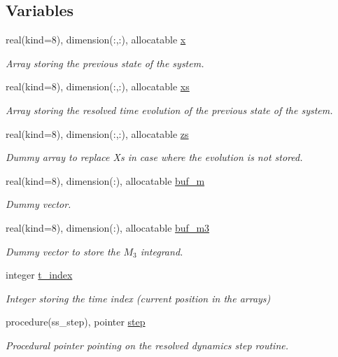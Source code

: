 \subsection*{Variables}
\begin{DoxyCompactItemize}
\item 
real(kind=8), dimension(\+:,\+:), allocatable \hyperlink{namespacememory_aa7e328e0fcaf0f4fdf9dc450ccfdfd5b}{x}
\begin{DoxyCompactList}\small\item\em Array storing the previous state of the system. \end{DoxyCompactList}\item 
real(kind=8), dimension(\+:,\+:), allocatable \hyperlink{namespacememory_ab57f9b5df41de423255f146f2cf3220a}{xs}
\begin{DoxyCompactList}\small\item\em Array storing the resolved time evolution of the previous state of the system. \end{DoxyCompactList}\item 
real(kind=8), dimension(\+:,\+:), allocatable \hyperlink{namespacememory_a7ea83fadf351bfaa6c8ec2540cb80a87}{zs}
\begin{DoxyCompactList}\small\item\em Dummy array to replace Xs in case where the evolution is not stored. \end{DoxyCompactList}\item 
real(kind=8), dimension(\+:), allocatable \hyperlink{namespacememory_a533d8a2daef9b9feb5ee1cad8b2ae0c7}{buf\+\_\+m}
\begin{DoxyCompactList}\small\item\em Dummy vector. \end{DoxyCompactList}\item 
real(kind=8), dimension(\+:), allocatable \hyperlink{namespacememory_a69ca63c73a29fb91cce2a4c640c94403}{buf\+\_\+m3}
\begin{DoxyCompactList}\small\item\em Dummy vector to store the $M_3$ integrand. \end{DoxyCompactList}\item 
integer \hyperlink{namespacememory_a44d4dddcb5f5cbcbab4164c85448193d}{t\+\_\+index}
\begin{DoxyCompactList}\small\item\em Integer storing the time index (current position in the arrays) \end{DoxyCompactList}\item 
procedure(ss\+\_\+step), pointer \hyperlink{namespacememory_ab1b54ce36a854642cb662080f609a897}{step}
\begin{DoxyCompactList}\small\item\em Procedural pointer pointing on the resolved dynamics step routine. \end{DoxyCompactList}\end{DoxyCompactItemize}


